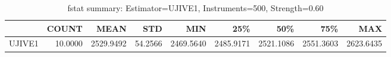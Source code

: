 \begin{table}[ht]
\centering
\caption{fstat summary: Estimator=UJIVE1, Instruments=500, Strength=0.60}
\begin{tabular}{lrrrrrrrr}
\toprule
 & COUNT & MEAN & STD & MIN & 25\% & 50\% & 75\% & MAX \\
\midrule
UJIVE1 & 10.0000 & 2529.9492 & 54.2566 & 2469.5640 & 2485.9171 & 2521.1086 & 2551.3603 & 2623.6435 \\
\bottomrule
\end{tabular}
\end{table}
